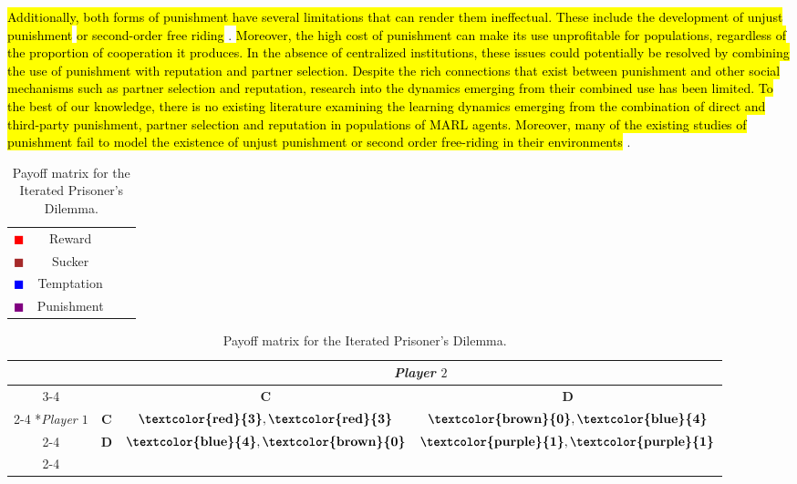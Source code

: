 \documentclass[sn-aps,numbered]{sn-jnl}%
\theoremstyle{thmstyleone}%
\theoremstyle{thmstyletwo}%
\theoremstyle{thmstylethree}%
\begin{document}
\hl{Additionally, both forms of punishment have several limitations that can render them ineffectual. These include the development of unjust punishment }\citep{punishment_counter_punishment_nikiforakis, Pleasant2018, Herrmann2008, Rand2010} \hl{or second-order free riding} \citep{Redhead2021, Raihani2015_tpp_rewarded_helpers, Dreber2008}. \hl{Moreover, the high cost of punishment can make its use unprofitable for populations, regardless of the proportion of cooperation it produces. In the absence of centralized institutions, these issues could potentially be resolved by combining the use of punishment with reputation and partner selection. Despite the rich connections that exist between punishment and other social mechanisms such as partner selection and reputation, research into the dynamics emerging from their combined use has been limited. To the best of our knowledge, there is no existing literature examining the learning dynamics emerging from the combination of direct and third-party punishment, partner selection and reputation in populations of MARL agents. Moreover, many of the existing studies of punishment fail to model the existence of unjust punishment or second order free-riding in their environments} \citep{division_of_labour, stable_metapunish, Redhead2021, boyd1992punishment}. 

\begin{table}[t]
\centering
\begin{tabular}{c c c c}
    \textcolor{red}{$\blacksquare$} & Reward \\
    \textcolor{brown}{$\blacksquare$} & Sucker \\
    \textcolor{blue}{$\blacksquare$} & Temptation \\
    \textcolor{purple}{$\blacksquare$} & Punishment \end{tabular}
\begin{tabular}{*{4}{c|}}
    \multicolumn{2}{c}{} & \multicolumn{2}{c}{\textit{Player $2$}}\\\cline{3-4}
    \multicolumn{1}{c}{} &  & \textbf{C}  & \textbf{D} \\\cline{2-4}
    \multirow{2}*{\textit{Player $1$}}  & \textbf{C} & $\textbf{\textcolor{red}{3}}, \textbf{\textcolor{red}{3}}$ & $\textbf{\textbf{\textcolor{brown}{0}}},  \textbf{\textbf{\textcolor{blue}{4}}}$ \\\cline{2-4}
    & \textbf{D} & $\textbf{\textcolor{blue}{4}}, \textbf{\textcolor{brown}{0}}$ & $\textbf{\textcolor{purple}{1}}, \textbf{\textcolor{purple}{1}}$ \\\cline{2-4}
\end{tabular}
\caption{Payoff matrix for the Iterated Prisoner's Dilemma.}
\label{ipd_payoff_matrix}
\end{table}
\end{document}
